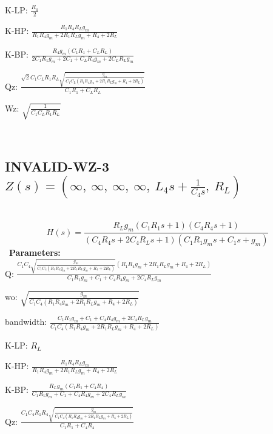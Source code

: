 \documentclass{article}
\begin{document}
K-LP: $\frac{R_{4}}{2}$\ 

K-HP: $\frac{R_{1} R_{4} R_{L} g_{m}}{R_{1} R_{4} g_{m} + 2 R_{1} R_{L} g_{m} + R_{4} + 2 R_{L}}$\ 

K-BP: $\frac{R_{4} g_{m} \left(C_{1} R_{1} + C_{L} R_{L}\right)}{2 C_{1} R_{1} g_{m} + 2 C_{1} + C_{L} R_{4} g_{m} + 2 C_{L} R_{L} g_{m}}$\ 

Qz: $\frac{\sqrt{2} C_{1} C_{L} R_{1} R_{L} \sqrt{\frac{g_{m}}{C_{1} C_{L} \left(R_{1} R_{4} g_{m} + 2 R_{1} R_{L} g_{m} + R_{4} + 2 R_{L}\right)}}}{C_{1} R_{1} + C_{L} R_{L}}$\ 

Wz: $\sqrt{\frac{1}{C_{1} C_{L} R_{1} R_{L}}}$\ 

\ 

\subsection{INVALID-WZ-3 $Z(s) = \left( \infty, \  \infty, \  \infty, \  \infty, \  L_{4} s + \frac{1}{C_{4} s}, \  R_{L}\right)$ } \ 
\textbf{\[H(s) = \frac{R_{L} g_{m} \left(C_{1} R_{1} s + 1\right) \left(C_{4} R_{4} s + 1\right)}{\left(C_{4} R_{4} s + 2 C_{4} R_{L} s + 1\right) \left(C_{1} R_{1} g_{m} s + C_{1} s + g_{m}\right)}\] } \ 
\textbf{Parameters:}\\ 

Q: $\frac{C_{1} C_{4} \sqrt{\frac{g_{m}}{C_{1} C_{4} \left(R_{1} R_{4} g_{m} + 2 R_{1} R_{L} g_{m} + R_{4} + 2 R_{L}\right)}} \left(R_{1} R_{4} g_{m} + 2 R_{1} R_{L} g_{m} + R_{4} + 2 R_{L}\right)}{C_{1} R_{1} g_{m} + C_{1} + C_{4} R_{4} g_{m} + 2 C_{4} R_{L} g_{m}}$\ 

wo: $\sqrt{\frac{g_{m}}{C_{1} C_{4} \left(R_{1} R_{4} g_{m} + 2 R_{1} R_{L} g_{m} + R_{4} + 2 R_{L}\right)}}$\ 

bandwidth: $\frac{C_{1} R_{1} g_{m} + C_{1} + C_{4} R_{4} g_{m} + 2 C_{4} R_{L} g_{m}}{C_{1} C_{4} \left(R_{1} R_{4} g_{m} + 2 R_{1} R_{L} g_{m} + R_{4} + 2 R_{L}\right)}$\ 

K-LP: $R_{L}$\ 

K-HP: $\frac{R_{1} R_{4} R_{L} g_{m}}{R_{1} R_{4} g_{m} + 2 R_{1} R_{L} g_{m} + R_{4} + 2 R_{L}}$\ 

K-BP: $\frac{R_{L} g_{m} \left(C_{1} R_{1} + C_{4} R_{4}\right)}{C_{1} R_{1} g_{m} + C_{1} + C_{4} R_{4} g_{m} + 2 C_{4} R_{L} g_{m}}$\ 

Qz: $\frac{C_{1} C_{4} R_{1} R_{4} \sqrt{\frac{g_{m}}{C_{1} C_{4} \left(R_{1} R_{4} g_{m} + 2 R_{1} R_{L} g_{m} + R_{4} + 2 R_{L}\right)}}}{C_{1} R_{1} + C_{4} R_{4}}$\ 
\end{document}
